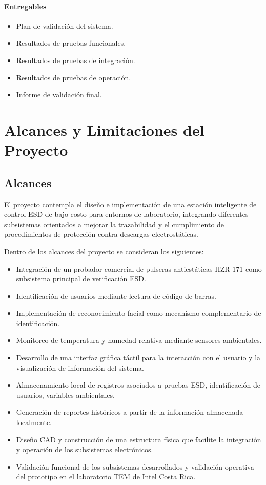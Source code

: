 \paragraph{Entregables}

\begin{itemize}
    \item Plan de validación del sistema.
    \item Resultados de pruebas funcionales.
    \item Resultados de pruebas de integración.
    \item Resultados de pruebas de operación.
    \item Informe de validación final.
\end{itemize}

\section{Alcances y Limitaciones del Proyecto}

\subsection{Alcances}

El proyecto contempla el diseño e implementación de una estación inteligente de control ESD de bajo costo para entornos de laboratorio, integrando diferentes subsistemas orientados a mejorar la trazabilidad y el cumplimiento de procedimientos de protección contra descargas electrostáticas.

Dentro de los alcances del proyecto se consideran los siguientes:

\begin{itemize}
\item Integración de un probador comercial de pulseras antiestáticas HZR-171 como subsistema principal de verificación ESD.
\item Identificación de usuarios mediante lectura de código de barras.
\item Implementación de reconocimiento facial como mecanismo complementario de identificación.
\item Monitoreo de temperatura y humedad relativa mediante sensores ambientales.
\item Desarrollo de una interfaz gráfica táctil para la interacción con el usuario y la visualización de información del sistema.
\item Almacenamiento local de registros asociados a pruebas ESD, identificación de usuarios, variables ambientales.
\item Generación de reportes históricos a partir de la información almacenada localmente.
\item Diseño CAD y construcción de una estructura física que facilite la integración y operación de los subsistemas electrónicos.
\item Validación funcional de los subsistemas desarrollados y validación operativa del prototipo en el laboratorio TEM de Intel Costa Rica.
\end{itemize}

